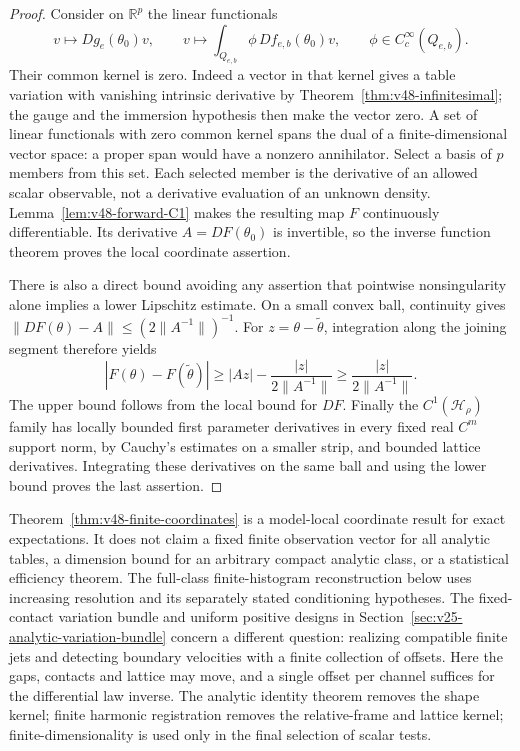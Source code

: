 \begin{proof}
Consider on $\mathbb R^p$ the linear functionals
\[
 v\longmapsto Dg_e(\theta_0)v,\qquad
 v\longmapsto\int_{Q_{e,b}}\phi\,Df_{e,b}(\theta_0)v,
                 \qquad \phi\in C_c^\infty(Q_{e,b}).
\]
Their common kernel is zero.  Indeed a vector in that kernel gives a
table variation with vanishing intrinsic derivative by
Theorem~\ref{thm:v48-infinitesimal}; the gauge and the immersion
hypothesis then make the vector zero.  A set of linear functionals
with zero common kernel spans the dual of a finite-dimensional vector
space: a proper span would have a nonzero annihilator.  Select a
basis of $p$ members from this set.  Each selected member is the
derivative of an allowed scalar observable, not a derivative evaluation
of an unknown density.  Lemma~\ref{lem:v48-forward-C1} makes the
resulting map $F$ continuously differentiable.  Its derivative
$A=DF(\theta_0)$ is invertible, so the inverse function theorem proves
the local coordinate assertion.

There is also a direct bound avoiding any assertion that pointwise
nonsingularity alone implies a lower Lipschitz estimate.  On a small
convex ball, continuity gives
$\|DF(\theta)-A\|\le(2\|A^{-1}\|)^{-1}$.  For
$z=\theta-\widetilde\theta$, integration along the joining segment
therefore yields
\[
 |F(\theta)-F(\widetilde\theta)|
 \ge |Az|-\frac{|z|}{2\|A^{-1}\|}
 \ge\frac{|z|}{2\|A^{-1}\|}.
\]
The upper bound follows from the local bound for $DF$.  Finally the
$C^1(\mathcal H_\rho)$ family has locally bounded first parameter
derivatives in every fixed real $C^m$ support norm, by Cauchy's
estimates on a smaller strip, and bounded lattice derivatives.
Integrating these derivatives on the same ball and using the lower
bound proves the last assertion.
\end{proof}

Theorem~\ref{thm:v48-finite-coordinates} is a model-local coordinate
result for exact expectations.  It does not claim a fixed finite
observation vector for all analytic tables, a dimension bound for an
arbitrary compact analytic class, or a statistical efficiency theorem.
The full-class finite-histogram reconstruction below uses increasing
resolution and its separately stated conditioning hypotheses.  The
fixed-contact variation bundle and uniform positive designs in
Section~\ref{sec:v25-analytic-variation-bundle} concern a different question:
realizing compatible finite jets and detecting boundary velocities with
a finite collection of offsets.  Here the gaps, contacts and lattice
may move, and a single offset per channel suffices for the differential
law inverse.  The analytic identity theorem removes the shape kernel;
finite harmonic registration removes the relative-frame and lattice
kernel; finite-dimensionality is used only in the final selection of
scalar tests.
